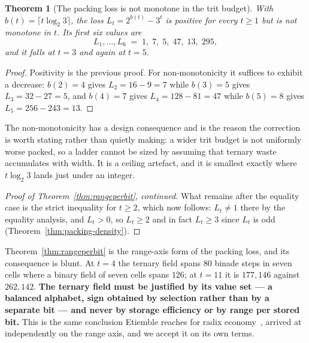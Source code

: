 \documentclass[11pt]{article}
\newtheorem{theorem}{Theorem}
\theoremstyle{definition}
\begin{document}
\begin{theorem}[The packing loss is not monotone in the trit budget]
\label{thm:lossnonmonotone}
With $b(t) = \lceil t \log_2 3\rceil$, the loss $L_t = 2^{b(t)} - 3^{t}$ is
positive for every $t \ge 1$ but is not monotone in $t$. Its first six values are
\[
  L_1,\dots,L_6 \;=\; 1,\; 7,\; 5,\; 47,\; 13,\; 295 ,
\]
and it falls at $t = 3$ and again at $t = 5$.
\end{theorem}

\begin{proof}
Positivity is the previous proof. For non-monotonicity it suffices to exhibit a
decrease: $b(2) = 4$ gives $L_2 = 16 - 9 = 7$ while $b(3) = 5$ gives
$L_3 = 32 - 27 = 5$, and $b(4) = 7$ gives $L_4 = 128 - 81 = 47$ while $b(5) = 8$
gives $L_5 = 256 - 243 = 13$.
\end{proof}

The non-monotonicity has a design consequence and is the reason the correction is
worth stating rather than quietly making: a wider trit budget is not uniformly
worse packed, so a ladder cannot be sized by assuming that ternary waste
accumulates with width. It is a ceiling artefact, and it is smallest exactly where
$t\log_2 3$ lands just under an integer.

\begin{proof}[Proof of Theorem~\ref{thm:rangeperbit}, continued]
What remains after the equality case is the strict inequality for $t \ge 2$, which
now follows: $L_t \ne 1$ there by the equality analysis, and $L_t > 0$, so
$L_t \ge 2$ and in fact $L_t \ge 3$ since $L_t$ is odd
(Theorem~\ref{thm:packing-density}).
\end{proof}

Theorem~\ref{thm:rangeperbit} is the range-axis form of the packing loss, and its
consequence is blunt. At $t = 4$ the ternary field spans $80$ binade steps in
seven cells where a binary field of seven cells spans $126$; at $t = 11$ it is
$177{,}146$ against $262{,}142$. \textbf{The ternary field must be justified by
its value set --- a balanced alphabet, sign obtained by selection rather than by a
separate bit --- and never by storage efficiency or by range per stored bit.}
This is the same conclusion Etiemble reaches for radix
economy~\cite{etiemble2019}, arrived at independently on the range axis,
and we accept it on its own terms.
\end{document}
